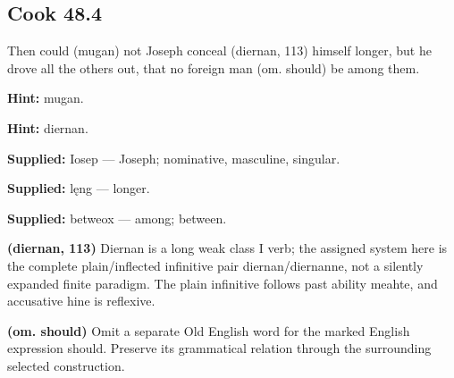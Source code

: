 \par\begin{minipage}{\linewidth}\raggedright
\subsection*{Cook 48.4}

Then could (mugan) not Joseph conceal (diernan, 113) himself longer, but he drove all the others out, that no foreign man (om. should) be among them.

\textbf{Hint:} mugan.

\textbf{Hint:} diernan.

\textbf{Supplied:} Iosep — Joseph; nominative, masculine, singular.

\end{minipage}\par\addvspace{4pt}

\textbf{Supplied:} lęng — longer.

\textbf{Supplied:} betweox — among; between.

\textbf{(diernan, 113)} Diernan is a long weak class I verb; the assigned system here is the complete plain/\allowbreak{}inflected infinitive pair diernan/\allowbreak{}diernanne, not a silently expanded finite paradigm. The plain infinitive follows past ability meahte, and accusative hine is reflexive.

\textbf{(om. should)} Omit a separate Old English word for the marked English expression should. Preserve its grammatical relation through the surrounding selected construction.

